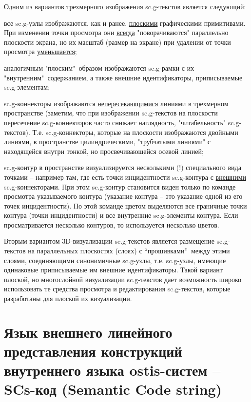 Одним из вариантов трехмерного изображения sc.g-текстов является следующий:
\begin{textitemize}
	\item все sc.g-узлы изображаются, как и ранее, \uline{плоскими} графическими примитивами. При изменении точки просмотра они \uline{всегда} "поворачиваются"{} параллельно плоскости экрана, но их масштаб (размер на экране) при удалении от  точки просмотра \uline{уменьшается};
	\item аналогичным "плоским"\ образом изображаются sc.g-рамки с их "внутренним"\ содержанием, а также внешние идентификаторы, приписываемые sc.g-элементам;
	\item sc.g-коннекторы изображаются \uline{непересекающимися} линиями в трехмерном пространстве (заметим, что при изображении sc.g-текстов на плоскости пересечение sc.g-коннекторов часто снижает наглядность, "читабельность"{} sc.g-текстов). Т.е. sc.g-коннекторы, которые на плоскости изображаются двойными линиями, в пространстве  цилиндрическими, "трубчатыми линиями"{} с находящейся внутри тонкой, но просвечивающейся осевой линией;
	\item sc.g-контур в пространстве визуализируется несколькими (!) специального вида точками -- например там, где есть точки инцидентности sc.g-контура с \uline{внешними} sc.g-коннекторами. При этом sc.g-контур становится виден только по команде просмотра указываемого контура (указание контура -- это указание одной из его точек инцидентности). По этой команде цветом выделяются все граничные точки контура (точки инцидентности) и все внутренние sc.g-элементы контура. Если просматривается  несколько контуров, то используется несколько цветов.
\end{textitemize}

Вторым вариантом 3D-визуализации sc.g-текстов является размещение sc.g-текстов на параллельных плоскостях (слоях) с “прошивками”\ между этими слоями, соединяющими синонимичные sc.g-узлы, т.е. sc.g-узлы, имеющие одинаковые приписываемые им внешние идентификаторы. Такой вариант плоской, но многослойной визуализации sc.g-текстов дает возможность широко использовать те средства просмотра и редактирования sc.g-текстов, которые разработаны для плоской их визуализации.


\section{Язык внешнего линейного представления конструкций внутреннего языка ostis-систем -- SCs-код (Semantic Code string)}
\label{sec_scs}


